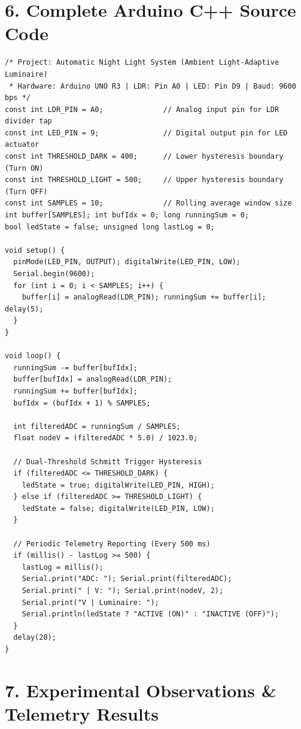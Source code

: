 \documentclass[10pt,a4paper]{article}
\begin{document}
\section*{6. Complete Arduino C++ Source Code}
\begin{lstlisting}[style=bwArduino, title={\textbf{Program Listing 1.1: Production Firmware for Automatic Night Light with Moving-Average Filtering \& Hysteresis.}}]
/* Project: Automatic Night Light System (Ambient Light-Adaptive Luminaire)
 * Hardware: Arduino UNO R3 | LDR: Pin A0 | LED: Pin D9 | Baud: 9600 bps */
const int LDR_PIN = A0;              // Analog input pin for LDR divider tap
const int LED_PIN = 9;               // Digital output pin for LED actuator
const int THRESHOLD_DARK = 400;      // Lower hysteresis boundary (Turn ON)
const int THRESHOLD_LIGHT = 500;     // Upper hysteresis boundary (Turn OFF)
const int SAMPLES = 10;              // Rolling average window size
int buffer[SAMPLES]; int bufIdx = 0; long runningSum = 0;
bool ledState = false; unsigned long lastLog = 0;

void setup() {
  pinMode(LED_PIN, OUTPUT); digitalWrite(LED_PIN, LOW);
  Serial.begin(9600);
  for (int i = 0; i < SAMPLES; i++) {
    buffer[i] = analogRead(LDR_PIN); runningSum += buffer[i]; delay(5);
  }
}

void loop() {
  runningSum -= buffer[bufIdx];
  buffer[bufIdx] = analogRead(LDR_PIN);
  runningSum += buffer[bufIdx];
  bufIdx = (bufIdx + 1) % SAMPLES;

  int filteredADC = runningSum / SAMPLES;
  float nodeV = (filteredADC * 5.0) / 1023.0;

  // Dual-Threshold Schmitt Trigger Hysteresis
  if (filteredADC <= THRESHOLD_DARK) {
    ledState = true; digitalWrite(LED_PIN, HIGH);
  } else if (filteredADC >= THRESHOLD_LIGHT) {
    ledState = false; digitalWrite(LED_PIN, LOW);
  }

  // Periodic Telemetry Reporting (Every 500 ms)
  if (millis() - lastLog >= 500) {
    lastLog = millis();
    Serial.print("ADC: "); Serial.print(filteredADC);
    Serial.print(" | V: "); Serial.print(nodeV, 2);
    Serial.print("V | Luminaire: ");
    Serial.println(ledState ? "ACTIVE (ON)" : "INACTIVE (OFF)");
  }
  delay(20);
}
\end{lstlisting}

\section*{7. Experimental Observations \& Telemetry Results}
\end{document}
